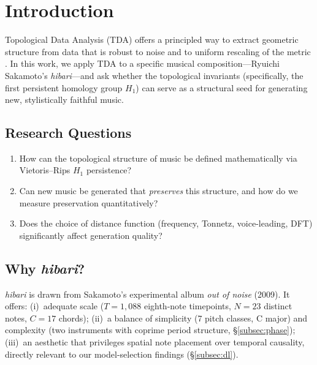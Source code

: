 \documentclass[conference,10pt,a4paper]{IEEEtran}
\begin{document}
\section{Introduction}
\label{sec:intro}

Topological Data Analysis (TDA) offers a principled way to extract
geometric structure from data that is robust to noise and to
uniform rescaling of the metric
\cite{carlsson2009,edelsbrunner2010}.  In this work, we apply TDA to
a specific musical composition---Ryuichi Sakamoto's \emph{hibari}---and
ask whether the topological invariants (specifically, the first
persistent homology group $H_1$) can serve as a structural seed for
generating new, stylistically faithful music.

\subsection{Research Questions}
\begin{enumerate}
\item How can the topological structure of music be defined
      mathematically via Vietoris--Rips $H_1$ persistence?
\item Can new music be generated that \emph{preserves} this structure,
      and how do we measure preservation quantitatively?
\item Does the choice of distance function (frequency, Tonnetz,
      voice-leading, DFT) significantly affect generation quality?
\end{enumerate}

\subsection{Why \emph{hibari}?}
\emph{hibari} is drawn from Sakamoto's experimental album
\emph{out of noise} (2009).  It offers:
(i)~adequate scale ($T = 1{,}088$ eighth-note timepoints, $N = 23$
distinct notes, $C = 17$ chords);
(ii)~a balance of simplicity (7 pitch classes, C major) and complexity
(two instruments with coprime period structure, \S\ref{subsec:phase});
(iii)~an aesthetic that privileges spatial note placement over temporal
causality, directly relevant to our model-selection findings (\S\ref{subsec:dl}).
\end{document}
